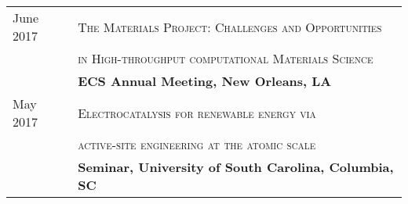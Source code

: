 \documentclass[a4paper,10pt]{article}
\begin{document}
\begin{tabular}{ll}
June 2017 &\textsc{The Materials Project: Challenges and Opportunities}\\
& \textsc{in High-throughput computational Materials Science} \vspace{0.04in} \\
& \textbf{ECS Annual Meeting, New Orleans, LA} \vspace{0.06in} \\
May 2017 & \textsc{Electrocatalysis for renewable energy via}\\
& \textsc{active-site engineering at the atomic scale}\vspace{0.04in}\\
& \textbf{Seminar, University of South Carolina, Columbia, SC}\\
\end{tabular}
\end{document}

